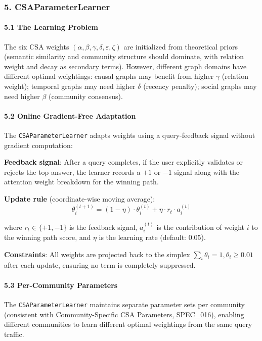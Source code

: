 \documentclass[10pt,journal,compsoc]{IEEEtran}
\begin{document}
\subsubsection{5. CSAParameterLearner}

\paragraph{5.1 The Learning Problem}
The six CSA weights $(\alpha, \beta, \gamma, \delta, \varepsilon, \zeta)$ are initialized from theoretical priors (semantic similarity and community structure should dominate, with relation weight and decay as secondary terms). However, different graph domains have different optimal weightings: causal graphs may benefit from higher $\gamma$ (relation weight); temporal graphs may need higher $\delta$ (recency penalty); social graphs may need higher $\beta$ (community consensus).

\paragraph{5.2 Online Gradient-Free Adaptation}
The \texttt{CSAParameterLearner} adapts weights using a query-feedback signal without gradient computation:

\textbf{Feedback signal}: After a query completes, if the user explicitly validates or rejects the top answer, the learner records a $+1$ or $-1$ signal along with the attention weight breakdown for the winning path.

\textbf{Update rule} (coordinate-wise moving average):
\begin{equation}
\theta_i^{(t+1)} = (1 - \eta) \cdot \theta_i^{(t)} + \eta \cdot r_t \cdot a_i^{(t)}
\end{equation}

where $r_t \in \{+1, -1\}$ is the feedback signal, $a_i^{(t)}$ is the contr\-ibution of weight $i$ to the winning path score, and $\eta$ is the learning rate (default: 0.05).

\textbf{Constraints}: All weights are projected back to the simplex $\sum_i \theta_i = 1, \theta_i \geq 0.01$ after each update, ensuring no term is completely suppressed.

\paragraph{5.3 Per-Community Parameters}
The \texttt{CSAParameterLearner} maintains separate parameter sets per community (consistent with Community-Specific CSA Parameters, SPEC\_016), enabling different communities to learn different optimal weightings from the same query traffic.
\end{document}
